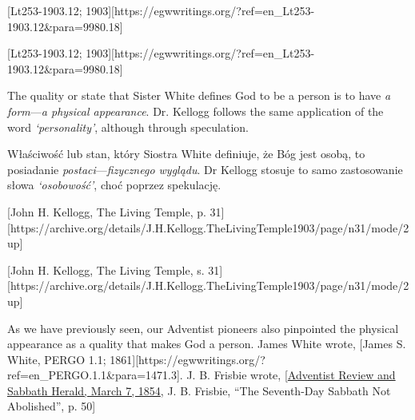 [Lt253-1903.12; 1903][https://egwwritings.org/?ref=en\_Lt253-1903.12&para=9980.18]


[Lt253-1903.12; 1903][https://egwwritings.org/?ref=en\_Lt253-1903.12&para=9980.18]


The quality or state that Sister White defines God to be a person is to have \textit{a form}—\textit{a physical appearance}. Dr. Kellogg follows the same application of the word \textit{‘personality’}, although through speculation.


Właściwość lub stan, który Siostra White definiuje, że Bóg jest osobą, to posiadanie \textit{postaci}—\textit{fizycznego wyglądu}. Dr Kellogg stosuje to samo zastosowanie słowa \textit{‘osobowość’}, choć poprzez spekulację.


[John H. Kellogg, The Living Temple, p. 31][https://archive.org/details/J.H.Kellogg.TheLivingTemple1903/page/n31/mode/2up]


[John H. Kellogg, The Living Temple, s. 31][https://archive.org/details/J.H.Kellogg.TheLivingTemple1903/page/n31/mode/2up]


As we have previously seen, our Adventist pioneers also pinpointed the physical appearance as a quality that makes God a person. James White wrote, [James S. White, PERGO 1.1; 1861][https://egwwritings.org/?ref=en\_PERGO.1.1&para=1471.3]. J. B. Frisbie wrote, [\href{https://documents.adventistarchives.org/Periodicals/RH/RH18540307-V05-07.pdf}{Adventist Review and Sabbath Herald, March 7, 1854}, J. B. Frisbie, “The Seventh-Day Sabbath Not Abolished”, p. 50]


